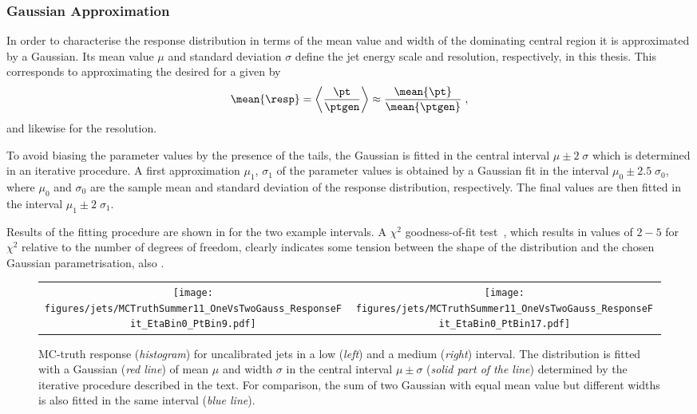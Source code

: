\subsubsection{Gaussian Approximation} \label{sec:Jets:JEC:Response:GaussianApproximation}
In order to characterise the response distribution in terms of the mean value and width of the dominating central region it is approximated by a Gaussian.
Its mean value $\mu$ and standard deviation $\sigma$ define the jet energy scale and resolution, respectively, in this thesis.
This corresponds to approximating the desired \mean{\pt} for a given \mean{\ptgen} by
\begin{equation*}
  \mean{\resp} = \left\langle\frac{\pt}{\ptgen}\right\rangle \approx \frac{\mean{\pt}}{\mean{\ptgen}} \;,
\end{equation*}
and likewise for the resolution.

To avoid biasing the parameter values by the presence of the tails, the Gaussian is fitted in the central interval \mbox{$\mu\pm2\;\sigma$} which is determined in an iterative procedure.
A first approximation $\mu_{1}$, $\sigma_{1}$ of the parameter values is obtained by a Gaussian fit in the interval \mbox{$\mu_{0}\pm2.5\;\sigma_{0}$}, where $\mu_{0}$ and $\sigma_{0}$ are the sample mean and standard deviation of the response distribution, respectively.
The final values are then fitted in the interval \mbox{$\mu_{1}\pm2\;\sigma_{1}$}.

Results of the fitting procedure are shown in  for the two example intervals.
A $\chi^{2}$ goodness-of-fit test~\cite{bib:blobelLohrmann,bib:barlow}, which results in values of $2-5$ for $\chi^{2}$ relative to the number of degrees of freedom, clearly indicates some tension between the shape of the distribution and the chosen Gaussian parametrisation, \cf also .
\begin{figure}[!ht]
  \centering
  \begin{tabular}{cc}
    \texttt{[image: figures/jets/MCTruthSummer11\_OneVsTwoGauss\_ResponseFit\_EtaBin0\_PtBin9.pdf]} &
    \texttt{[image: figures/jets/MCTruthSummer11\_OneVsTwoGauss\_ResponseFit\_EtaBin0\_PtBin17.pdf]} \\
  \end{tabular}
  \caption{MC-truth response (\textit{histogram}) for uncalibrated jets in a low (\textit{left}) and a medium (\textit{right}) \ptgen interval.
    The distribution is fitted with a Gaussian (\textit{red line}) of mean $\mu$ and width $\sigma$ in the central interval \mbox{$\mu\pm\sigma$} (\textit{solid part of the line}) determined by the iterative procedure described in the text.
    For comparison, the sum of two Gaussian with equal mean value but different widths is also fitted in the same interval (\textit{blue line}).
  }
\label{fig:Jets:Response:UncorrectedResponseDistributionFit}
\end{figure}

